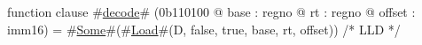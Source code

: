 function clause #\hyperref[zdecode]{decode}# (0b110100 @ base : regno @ rt : regno @ offset : imm16) =
  #\hyperref[zSome]{Some}#(#\hyperref[zLoad]{Load}#(D, false, true, base, rt, offset))  /* LLD */
